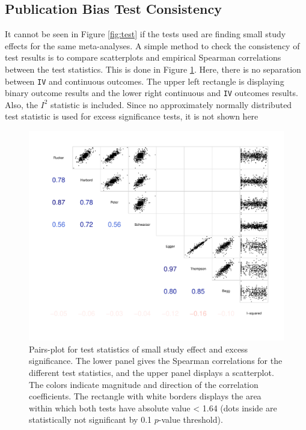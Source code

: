 \documentclass[11pt,a4paper,twoside]{book}\usepackage[]{graphicx}\usepackage[]{color}
\newenvironment{knitrout}{}{} %
\begin{document}
\subsection{Publication Bias Test Consistency}
It cannot be seen in Figure \ref{fig:test} if the tests used are finding small study effects for the same meta-analyses. A simple method to check the consistency of test results is to compare scatterplots and empirical Spearman correlations between the test statistics. This is done in Figure \ref{fig:test.agreement}. Here, there is no separation between \texttt{IV} and continuous outcomes. The upper left rectangle is displaying binary outcome results and the lower right continuous and \texttt{IV} outcomes results. Also, the $I^2$ statistic is included. Since no approximately normally distributed test statistic is used for excess significance tests, it is not shown here

\begin{figure}
\begin{knitrout}
\color{fgcolor}

{\centering \includegraphics[width=\textwidth-3cm]{figure/ch03_figunnamed-chunk-15-1} 

}



\end{knitrout}
\caption{Pairs-plot for test statistics of small study effect and excess significance. The lower panel gives the Spearman correlations for the different test statistics, and the upper panel displays a scatterplot. The colors indicate magnitude and direction of the correlation coefficients. The rectangle with white borders displays the area within which both tests have absolute value < 1.64 (dots inside are statistically not significant by 0.1 $p$-value threshold).}
\label{fig:test.agreement}
\end{figure}
\end{document}

